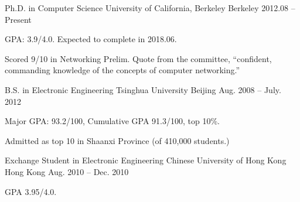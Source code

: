 

\begin{cventries}

  \cventry
  {Ph.D. in Computer Science}
  {University of California, Berkeley}
  {Berkeley}
  {2012.08 -- Present}
  {
    \begin{cvitems}
    \item GPA: 3.9/4.0. Expected to complete in 2018.06.
    \item Scored 9/10 in Networking Prelim. Quote from the committee,
      ``confident, commanding knowledge of the concepts of computer
      networking.''
    \end{cvitems}
  }

  \cventry
  {B.S. in Electronic Engineering}
  {Tsinghua University}
  {Beijing}
  {Aug. 2008 -- July. 2012}
  {
    \begin{cvitems}
    \item{Major GPA: 93.2/100, Cumulative GPA 91.3/100, top 10\%.}
    \item{Admitted as top 10 in Shaanxi Province (of 410,000 students.)}
    \end{cvitems}
  }

  \cventry
  {Exchange Student in Electronic Engineering}
  {Chinese University of Hong Kong}
  {Hong Kong}
  {Aug. 2010 -- Dec. 2010}
  {
    \begin{cvitems}
    \item {GPA 3.95/4.0.}
    \end{cvitems}
  }

\end{cventries}

